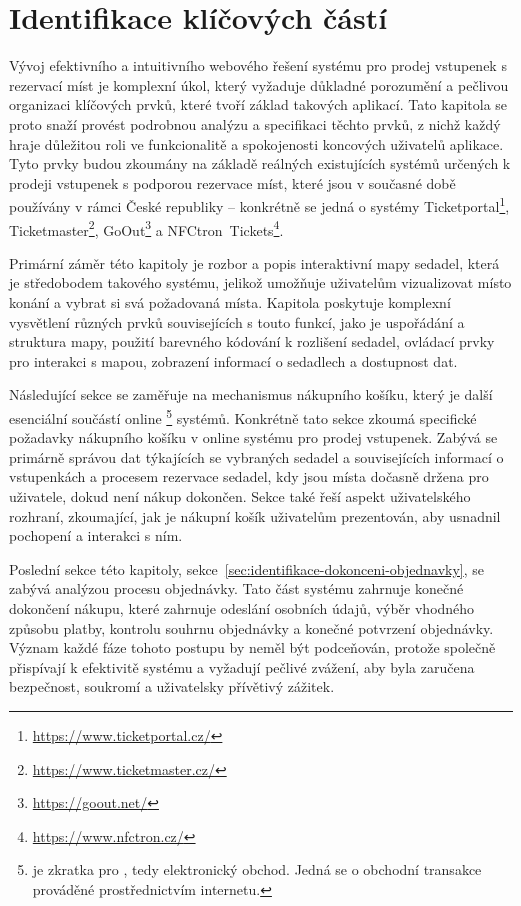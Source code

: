 \chapter{Identifikace klíčových částí}
\label{ch:identifikace}
Vývoj efektivního a intuitivního webového řešení systému pro prodej vstupenek s rezervací míst je komplexní úkol, který vyžaduje důkladné porozumění a pečlivou organizaci klíčových prvků, které tvoří základ takových aplikací.
Tato kapitola se proto snaží provést podrobnou analýzu a specifikaci těchto prvků, z nichž každý hraje důležitou roli ve funkcionalitě a spokojenosti koncových uživatelů aplikace.
Tyto prvky budou zkoumány na základě reálných existujících systémů určených k prodeji vstupenek s podporou rezervace míst, které jsou v současné době používány v rámci České republiky – konkrétně se jedná o systémy Ticketportal\footnote{\url{https://www.ticketportal.cz/}}, Ticketmaster\footnote{\url{https://www.ticketmaster.cz/}}, GoOut\footnote{\url{https://goout.net/}} a NFCtron~Tickets\footnote{\url{https://www.nfctron.cz/}}.

Primární záměr této kapitoly je rozbor a popis interaktivní mapy sedadel, která je středobodem takového systému, jelikož umožňuje uživatelům vizualizovat místo konání a vybrat si svá požadovaná místa.
Kapitola poskytuje komplexní vysvětlení různých prvků souvisejících s touto funkcí, jako je uspořádání a struktura mapy, použití barevného kódování k rozlišení sedadel, ovládací prvky pro interakci s mapou, zobrazení informací o sedadlech a dostupnost dat.

Následující sekce se zaměřuje na mechanismus nákupního košíku, který je další esenciální součástí online \footnote{ je zkratka pro , tedy elektronický obchod. Jedná se o obchodní transakce prováděné prostřednictvím internetu.} systémů.
Konkrétně tato sekce zkoumá specifické požadavky nákupního košíku v online systému pro prodej vstupenek.
Zabývá se primárně správou dat týkajících se vybraných sedadel a souvisejících informací o vstupenkách a procesem rezervace sedadel, kdy jsou místa dočasně držena pro uživatele, dokud není nákup dokončen.
Sekce také řeší aspekt uživatelského rozhraní, zkoumající, jak je nákupní košík uživatelům prezentován, aby usnadnil pochopení a interakci s ním.

Poslední sekce této kapitoly, sekce~\ref{sec:identifikace-dokonceni-objednavky}, se zabývá analýzou procesu objednávky.
Tato část systému zahrnuje konečné dokončení nákupu, které zahrnuje odeslání osobních údajů, výběr vhodného způsobu platby, kontrolu souhrnu objednávky a konečné potvrzení objednávky.
Význam každé fáze tohoto postupu by neměl být podceňován, protože společně přispívají k efektivitě systému a vyžadují pečlivé zvážení, aby byla zaručena bezpečnost, soukromí a uživatelsky přívětivý zážitek.

